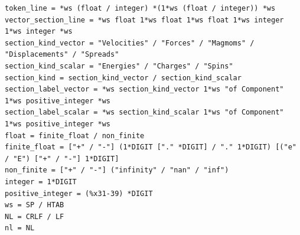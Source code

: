 \begin{lstlisting}[caption={Non-normative ABNF for one frame.},label={lst:abnf}]
token_line = *ws (float / integer) *(1*ws (float / integer)) *ws
vector_section_line = *ws float 1*ws float 1*ws float 1*ws integer 1*ws integer *ws
section_kind_vector = "Velocities" / "Forces" / "Magmoms" / "Displacements" / "Spreads"
section_kind_scalar = "Energies" / "Charges" / "Spins"
section_kind = section_kind_vector / section_kind_scalar
section_label_vector = *ws section_kind_vector 1*ws "of Component" 1*ws positive_integer *ws
section_label_scalar = *ws section_kind_scalar 1*ws "of Component" 1*ws positive_integer *ws
float = finite_float / non_finite
finite_float = ["+" / "-"] (1*DIGIT ["." *DIGIT] / "." 1*DIGIT) [("e" / "E") ["+" / "-"] 1*DIGIT]
non_finite = ["+" / "-"] ("infinity" / "nan" / "inf")
integer = 1*DIGIT
positive_integer = (%x31-39) *DIGIT
ws = SP / HTAB
NL = CRLF / LF
nl = NL
\end{lstlisting}
